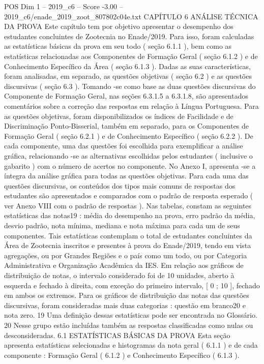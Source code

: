\begin{textsample}{POS Dim 1 – 2019\_c6 – Score -3.00 – 2019\_c6/enade\_2019\_zoot\_807802c04e.txt}  \label{ex:f1_pos_353}
CAPÍTULO 6 ANÁLISE TÉCNICA DA PROVA Este capítulo tem por objetivo apresentar o desempenho dos estudantes concluintes de Zootecnia no Enade/2019.
Para isso, foram calculadas as estatísticas básicas da prova em seu todo ( seção 6.1.1 ), bem como as estatísticas relacionadas aos Componentes de Formação Geral ( seção 6.1.2 ) e de Conhecimento Específico da Área ( seção 6.1.3 ).
Dadas as suas características, foram analisadas, em separado, as questões objetivas ( seção 6.2 ) e as questões discursivas ( seção 6.3 ).
Tomando -se como base as duas questões discursivas do Componente de Formação Geral, nas seções 6.3.1.5 a 6.3.1.8, são apresentados comentários sobre a correção das respostas em relação à Língua Portuguesa.
Para as questões objetivas, foram disponibilizados os índices de Facilidade e de Discriminação Ponto-Bisserial, também em separado, para os Componentes de Formação Geral ( seção 6.2.1 ) e de Conhecimento Específico ( seção 6.2.2 ).
De cada componente, uma das questões foi escolhida para exemplificar a análise gráfica, relacionando -se as alternativas escolhidas pelos estudantes ( inclusive o gabarito ) com o número de acertos no componente.
No Anexo I, apresenta -se a íntegra da análise gráfica para todas as questões objetivas.
Para cada uma das questões discursivas, os conteúdos dos tipos mais comuns de respostas dos estudantes são apresentados e comparados com o padrão de resposta esperado ( ver Anexo VIII com o padrão de respostas ).
Nas tabelas, constam as seguintes estatísticas das notas19 : média do desempenho na prova, erro padrão da média, desvio padrão, nota mínima, mediana e nota máxima para cada um de seus componentes.
Tais estatísticas contemplam o total de estudantes concluintes da Área de Zootecnia inscritos e presentes à prova do Enade/2019, tendo em vista agregações, ou por Grandes Regiões e o país como um todo, ou por Categoria Administrativa e Organização Acadêmica da IES.
Em relação aos gráficos de distribuição de notas, o intervalo considerado foi de 10 unidades, aberto à esquerda e fechado à direita, com exceção do primeiro intervalo, [ 0 ; 10 ], fechado em ambos os extremos.
Para os gráficos de distribuição das notas das questões discursivas, foram consideradas mais duas categorias : questão em branco20 e nota zero. 19 Uma definição dessas estatísticas pode ser encontrada no Glossário. 20 Nesse grupo estão incluídas também as respostas classificadas como nulas ou desconsideradas. 6.1 ESTATÍSTICAS BÁSICAS DA PROVA Esta seção apresenta estatísticas selecionadas e histogramas da nota geral ( 6.1.1 ) e de cada componente : Formação Geral ( 6.1.2 ) e Conhecimento Específico ( 6.1.3 ).

\end{textsample}

